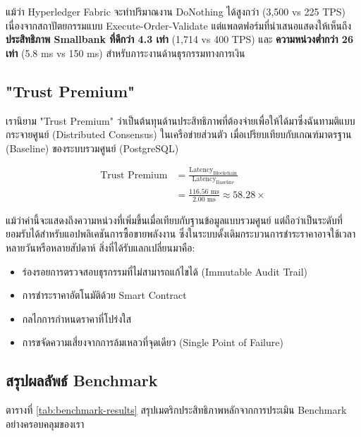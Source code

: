 \documentclass[conference,10pt]{IEEEtran}
\begin{document}
แม้ว่า Hyperledger Fabric จะทำปริมาณงาน DoNothing ได้สูงกว่า (3,500 vs 225 TPS) เนื่องจากสถาปัตยกรรมแบบ Execute-Order-Validate แต่แพลตฟอร์มที่นำเสนอแสดงให้เห็นถึง \textbf{ประสิทธิภาพ Smallbank ที่ดีกว่า 4.3 เท่า} (1,714 vs 400 TPS) และ \textbf{ความหน่วงต่ำกว่า 26 เท่า} (5.8 ms vs 150 ms) สำหรับภาระงานด้านธุรกรรมทางการเงิน

\subsection{"Trust Premium"}
เรานิยาม "Trust Premium" ว่าเป็นต้นทุนด้านประสิทธิภาพที่ต้องจ่ายเพื่อให้ได้มาซึ่งฉันทามติแบบกระจายศูนย์ (Distributed Consensus) ในเครือข่ายส่วนตัว เมื่อเปรียบเทียบกับเกณฑ์มาตรฐาน (Baseline) ของระบบรวมศูนย์ (PostgreSQL)

\begin{equation}
\begin{split}
\text{Trust Premium} &= \frac{\text{Latency}_{\text{Blockchain}}}{\text{Latency}_{\text{Baseline}}} \\
&= \frac{116.56\text{ ms}}{2.00\text{ ms}} \approx 58.28\times
\end{split}
\end{equation}

แม้ว่าค่านี้จะแสดงถึงความหน่วงที่เพิ่มขึ้นเมื่อเทียบกับฐานข้อมูลแบบรวมศูนย์ แต่ถือว่าเป็นระดับที่ยอมรับได้สำหรับแอปพลิเคชันการซื้อขายพลังงาน ซึ่งในระบบดั้งเดิมกระบวนการชำระราคาอาจใช้เวลาหลายวันหรือหลายสัปดาห์ สิ่งที่ได้รับแลกเปลี่ยนมาคือ:
\begin{itemize}
    \item ร่องรอยการตรวจสอบธุรกรรมที่ไม่สามารถแก้ไขได้ (Immutable Audit Trail)
    \item การชำระราคาอัตโนมัติด้วย Smart Contract
    \item กลไกการกำหนดราคาที่โปร่งใส
    \item การขจัดความเสี่ยงจากการล้มเหลวที่จุดเดียว (Single Point of Failure)
\end{itemize}

\subsection{สรุปผลลัพธ์ Benchmark}
ตารางที่ \ref{tab:benchmark-results} สรุปเมตริกประสิทธิภาพหลักจากการประเมิน Benchmark อย่างครอบคลุมของเรา
\end{document}
